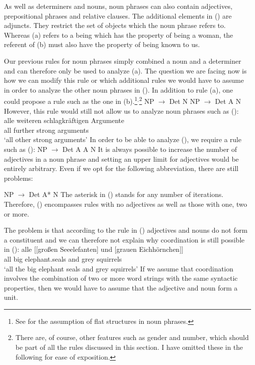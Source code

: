\noindent
As well as determiners and nouns, noun phrases can also contain adjectives, prepositional phrases and relative clauses. 
The additional elements in () are adjuncts. They restrict the set of objects which the noun phrase 
refers to. Whereas (a) refers to a being which has the property of being a woman, the referent of (b) must
also have the property of being known to us.

Our previous rules for noun phrases simply combined a noun and a determiner and can therefore only be used to
analyze (a). The question we are facing now is how we can modify this rule or which additional rules we would
have to assume in order to analyze the other noun phrases in (). In addition to rule (a), one could propose 
a rule such as the one in (b).\footnote{%
	See  for the assumption of flat structures in noun phrases.
}$^,$\footnote{%
	There are, of course, other features such as gender and number, which should be part of all the rules
	discussed in this section. I have omitted these in the following for ease of exposition.
}
\eal
\ex NP $\to$ Det N
\ex NP $\to$ Det A N
\zl
However, this rule would still not allow us to analyze noun phrases such as ():
\ea
\label{Beispiel-alle-weitern-schlagkraeftigen-Argumente}
\gll alle weiteren schlagkräftigen Argumente\\
	 all further strong arguments\\
\glt `all other strong arguments'
\z
In order to be able to analyze (), we require a rule such as (): 
\ea 
NP $\to$ Det A A N
\z
It is always possible to increase the number of adjectives in a noun phrase and setting an upper limit for
adjectives would be entirely arbitrary. Even if we opt for the following abbreviation, there are still problems:

\ea 
NP $\to$ Det A* N
\z
The asterisk\is{*} in () stands for any number of iterations. Therefore, () encompasses rules with no adjectives
as well as those with one, two or more.

The problem is that according to the rule in () adjectives and nouns do not form a constituent and we can therefore not explain why coordination 
is still possible in ():
\ea
\gll alle [[großen Seeelefanten] und [grauen Eichhörnchen]]\\
     all  \spacebr{}\spacebr{}big elephant.seals and  \spacebr{}grey squirrels\\
\glt `all the big elephant seals and grey squirrels'	 
\z
If we assume that coordination involves the combination of two or more word strings with the same syntactic properties, then we would have to assume
that the adjective and noun form a unit.

